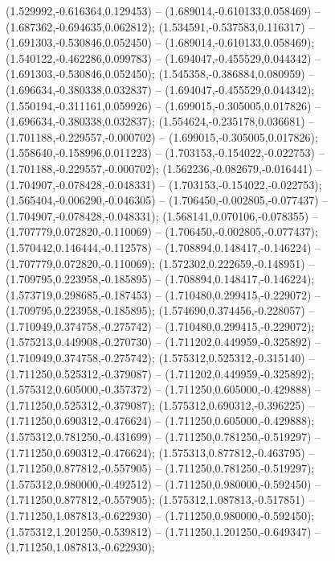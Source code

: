  (1.529992,-0.616364,0.129453) -- (1.689014,-0.610133,0.058469) -- (1.687362,-0.694635,0.062812);
 (1.534591,-0.537583,0.116317) -- (1.691303,-0.530846,0.052450) -- (1.689014,-0.610133,0.058469);
 (1.540122,-0.462286,0.099783) -- (1.694047,-0.455529,0.044342) -- (1.691303,-0.530846,0.052450);
 (1.545358,-0.386884,0.080959) -- (1.696634,-0.380338,0.032837) -- (1.694047,-0.455529,0.044342);
 (1.550194,-0.311161,0.059926) -- (1.699015,-0.305005,0.017826) -- (1.696634,-0.380338,0.032837);
 (1.554624,-0.235178,0.036681) -- (1.701188,-0.229557,-0.000702) -- (1.699015,-0.305005,0.017826);
 (1.558640,-0.158996,0.011223) -- (1.703153,-0.154022,-0.022753) -- (1.701188,-0.229557,-0.000702);
 (1.562236,-0.082679,-0.016441) -- (1.704907,-0.078428,-0.048331) -- (1.703153,-0.154022,-0.022753);
 (1.565404,-0.006290,-0.046305) -- (1.706450,-0.002805,-0.077437) -- (1.704907,-0.078428,-0.048331);
 (1.568141,0.070106,-0.078355) -- (1.707779,0.072820,-0.110069) -- (1.706450,-0.002805,-0.077437);
 (1.570442,0.146444,-0.112578) -- (1.708894,0.148417,-0.146224) -- (1.707779,0.072820,-0.110069);
 (1.572302,0.222659,-0.148951) -- (1.709795,0.223958,-0.185895) -- (1.708894,0.148417,-0.146224);
 (1.573719,0.298685,-0.187453) -- (1.710480,0.299415,-0.229072) -- (1.709795,0.223958,-0.185895);
 (1.574690,0.374456,-0.228057) -- (1.710949,0.374758,-0.275742) -- (1.710480,0.299415,-0.229072);
 (1.575213,0.449908,-0.270730) -- (1.711202,0.449959,-0.325892) -- (1.710949,0.374758,-0.275742);
 (1.575312,0.525312,-0.315140) -- (1.711250,0.525312,-0.379087) -- (1.711202,0.449959,-0.325892);
 (1.575312,0.605000,-0.357372) -- (1.711250,0.605000,-0.429888) -- (1.711250,0.525312,-0.379087);
 (1.575312,0.690312,-0.396225) -- (1.711250,0.690312,-0.476624) -- (1.711250,0.605000,-0.429888);
 (1.575312,0.781250,-0.431699) -- (1.711250,0.781250,-0.519297) -- (1.711250,0.690312,-0.476624);
 (1.575313,0.877812,-0.463795) -- (1.711250,0.877812,-0.557905) -- (1.711250,0.781250,-0.519297);
 (1.575312,0.980000,-0.492512) -- (1.711250,0.980000,-0.592450) -- (1.711250,0.877812,-0.557905);
 (1.575312,1.087813,-0.517851) -- (1.711250,1.087813,-0.622930) -- (1.711250,0.980000,-0.592450);
 (1.575312,1.201250,-0.539812) -- (1.711250,1.201250,-0.649347) -- (1.711250,1.087813,-0.622930);
